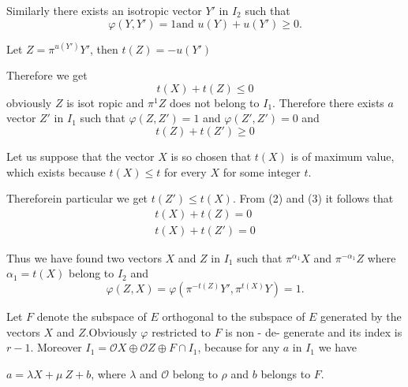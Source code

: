 Similarly there exists an isotropic vector $Y'$ in $I_2$ such that 
$$
\varphi(Y,Y')=1 \text {and } u(Y) +u(Y')\ge 0.
$$

Let $ Z= \pi^{u(Y')}Y'$, then $ t(Z)= -u(Y')$

Therefore we get
\begin{equation*}
  t(X)+t(Z)\leq 0\tag{2}
\end{equation*}
obviously $Z$ is isot ropic and $\pi^1 Z$ does not belong to
$I_1$. Therefore  there exists  $a$ vector $Z'$ in $I_1$  such that
$\varphi (Z,Z')=1$ and $\varphi (Z',Z')=0$ and  
\begin{equation*}
  t(Z) + t(Z') \ge 0\tag{3}
\end{equation*}

Let us suppose that the vector $X$ is so chosen that $t(X)$ is of
maximum value, which exists because $t(X) \leq t $ for every $X$ for
some integer $t$. 

Therefore\pageoriginale in particular we get $t(Z') \leq t (X)$. From (2) and
(3) it follows that  
\begin{gather*} 
  t(X) +t(Z)=0\\
  t(X) +t(Z')=0
\end{gather*}

Thus we have found two vectors $X$ and $Z$ in $I_1 $  such that $\pi
^{\alpha_1}X$ and $ \pi^{-\alpha_1}Z$ where $\alpha_1 =t(X) $
belong to $I_2 $ and  
$$
\varphi (Z,X)= \varphi (\pi^{-t(Z)}Y', \pi^{t(X)}Y)=1.
$$

Let $F$ denote the subspace of $E$ orthogonal to the subspace of $E$
generated by the vectors $X$ and $Z$.Obviously $\varphi$ restricted to
$F$ is non - de- generate and its index is $r-1$.  Moreover $ I_1=
\mathscr{O} X \oplus \mathscr{O} Z \oplus F \cap I_1$, because for
any $a$ in $I_1$ we  have 

$ a= \lambda X + \mu~ Z +b$, where $\lambda$ and
$\mathscr{O}$ belong to $\rho$ and $b$ belongs to $F$. 


